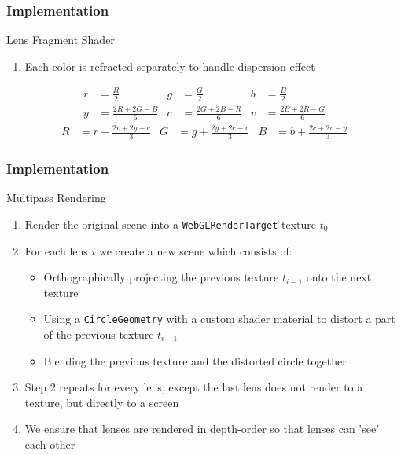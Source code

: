\documentclass{beamer}
\begin{document}
\begin{frame}
    \frametitle{Implementation}
    \begin{block}{Lens Fragment Shader}
        \begin{enumerate} 
            \item Each color is refracted separately to handle dispersion effect 
        \end{enumerate}
            \begin{align*} 
                r &= \frac{R}{2} & g &= \frac{G}{2} & b &= \frac{B}{2}\\
                y &= \frac{2R+2G-B}{6} & c&=\frac{2G+2B-R}{6} & v&=\frac{2B+2R-G}{6}
            \end{align*}
            \begin{align*} 
                R &= r + \frac{2v+2y-c}{3} & G &= g + \frac{2y+2c-v}{3} & B &= b + \frac{2c+2v-y}{3}
            \end{align*}
    \end{block}
\end{frame} 
\begin{frame}[fragile]
    \frametitle{Implementation}
    \begin{block}{Multipass Rendering}
        \begin{enumerate}

        \item Render the original scene into a \verb|WebGLRenderTarget| texture $t_0$
        \item For each lens $i$ we create a new scene which consists of:
        \begin{itemize}
            \item Orthographically projecting the previous texture $t_{i-1}$ onto the next texture
            \item Using a \verb|CircleGeometry| with a custom shader material to distort a part of the previous texture $t_{i-1}$ 
            \item Blending the previous texture and the distorted circle together
        \end{itemize}
        \item Step 2 repeats for every lens, except the last lens does not render to a texture, but directly to a screen
        \item  We ensure that lenses are rendered in depth-order so that lenses can 'see' each other
        \end{enumerate}
    \end{block}
\end{frame} 
\end{document}
